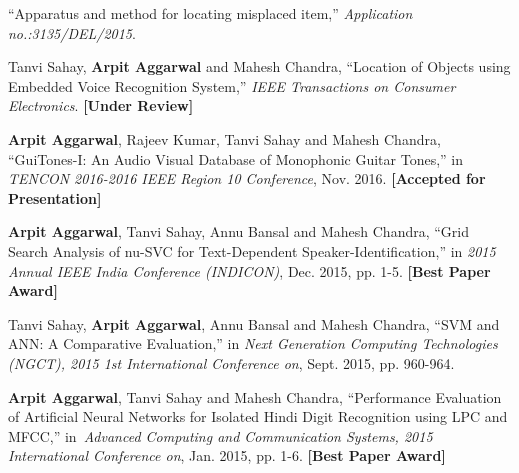 \vspace{-1em}
\begin{cventries}
\cventry
{}
{}
{}
{}
{
 \begin{cvlist}
	\item ``Apparatus and method for locating misplaced item,'' \textit{Application no.:3135/DEL/2015}.
 \end{cvlist}
}
\cventry
{}
{}
{}
{}
{\begin{cvlist}
	\item Tanvi Sahay, \textbf{Arpit Aggarwal} and Mahesh Chandra, ``Location of Objects using Embedded Voice Recognition System,'' \textit{IEEE Transactions on Consumer Electronics}. \textbf{[\scriptsize Under Review]}
 \end{cvlist}
 }
\cventry
{}
{}
{}
{}
{\begin{cvlist}
	\item \textbf{Arpit Aggarwal}, Rajeev Kumar, Tanvi Sahay and Mahesh Chandra, ``GuiTones-I: An Audio Visual Database of Monophonic Guitar Tones,'' in \textit{TENCON 2016-2016 IEEE Region 10 Conference}, Nov. 2016. \textbf{[\scriptsize Accepted for Presentation]} 
	\item \textbf{Arpit Aggarwal}, Tanvi Sahay, Annu Bansal and Mahesh Chandra, ``Grid Search Analysis of nu-SVC for Text-Dependent Speaker-Identiﬁcation,'' in \textit{2015 Annual IEEE India Conference (INDICON)}, Dec. 2015, pp. 1-5. \textbf{[\scriptsize Best Paper Award]} \href{http://ieeexplore.ieee.org/xpl/articleDetails.jsp?arnumber=7443790}{}
	\item Tanvi Sahay, \textbf{Arpit Aggarwal}, Annu Bansal and Mahesh Chandra, ``SVM and ANN: A Comparative Evaluation,'' in \textit{Next Generation Computing Technologies (NGCT), 2015 1st International Conference on}, Sept. 2015, pp. 960-964. \href{http://ieeexplore.ieee.org/xpl/articleDetails.jsp?arnumber=7375263}{}
	\item \textbf{Arpit Aggarwal}, Tanvi Sahay and Mahesh Chandra, ``Performance Evaluation of Artificial Neural Networks for Isolated Hindi Digit Recognition using LPC and MFCC,'' in~\textit{Advanced Computing and Communication Systems, 2015 International Conference on}, Jan. 2015, pp. 1-6. \textbf{[\scriptsize Best Paper Award]} \href{http://ieeexplore.ieee.org/xpl/articleDetails.jsp?arnumber=7324099}{}
\end{cvlist}
}
\end{cventries}




